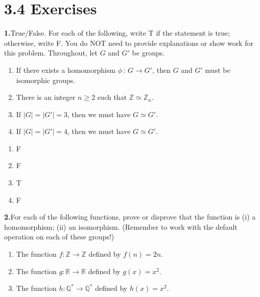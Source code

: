 \documentclass[10pt,]{book}
\theoremstyle{plain}
\theoremstyle{definition}
\theoremstyle{definition}
\theoremstyle{definition}
\theoremstyle{definition}
\numberwithin{equation}{section}
\def\Z{\mathbb{Z}}
\def\R{\mathbb{R}}
\def\Q{\mathbb{Q}}
\begin{document}
\section*{3.4 Exercises}
\noindent\textbf{1.}\quad{}True/False. For each of the following, write T if the statement is true; otherwise, write F. You do NOT need to provide explanations or show work for this problem. Throughout, let \(G\) and \(G'\) be groups. \leavevmode%
\begin{enumerate}[label=(\alph*)]
\item\hypertarget{li-157}{}If there exists a homomorphism \(\phi\,:\,G\to G'\), then \(G\) and \(G'\) must be isomorphic groups.%
\item\hypertarget{li-158}{}There is an integer \(n\geq 2\) such that \(\Z\simeq \Z_n\).%
\item\hypertarget{li-159}{}If \(|G|=|G'|=3\), then we must have \(G\simeq G'\).%
\item\hypertarget{li-160}{}If \(|G|=|G'|=4\), then we must have \(G\simeq G'\).%
\end{enumerate}
%
\par\smallskip
\leavevmode%
\begin{multicols}{4}
\begin{enumerate}[label=(\alph*)]
\item\hypertarget{li-161}{}F%
\item\hypertarget{li-162}{}F%
\item\hypertarget{li-163}{}T%
\item\hypertarget{li-164}{}F%
\end{enumerate}
\end{multicols}
\par\smallskip
\noindent\textbf{2.}\quad{}For each of the following functions, prove or disprove that the function is (i) a homomorphism; (ii) an isomorphism. (Remember to work with the default operation on each of these groups!) \leavevmode%
\begin{enumerate}[label=(\alph*)]
\item\hypertarget{li-165}{}The function \(f:\Z\to\Z\) defined by \(f(n)=2n\).%
\item\hypertarget{li-166}{}The function \(g:\R\to\R\) defined by \(g(x)=x^2\).%
\item\hypertarget{li-167}{}The function \(h:\Q^*\to\Q^*\) defined by \(h(x)=x^2\).%
\end{enumerate}
%
\par\smallskip
\leavevmode%
\end{document}
